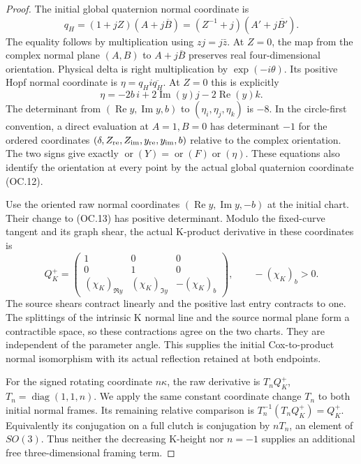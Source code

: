 \begin{proof}
The initial global quaternion normal coordinate is
\[
 q_H=(1+jZ)(A+j\overline B)
     =(Z^{-1}+j)(A'+j\overline {B'}).
 \tag{OC.12}
\]
The equality follows by multiplication using \(zj=j\bar z\).
At \(Z=0\), the map from the complex normal plane \((A,B)\) to
\(A+j\overline B\) preserves real four-dimensional orientation.
Physical delta is right multiplication by \(\exp(-i \theta)\). Its
positive Hopf normal coordinate is \(\eta=q_Hi\overline{q_H}\).
At \(Z=0\) this is explicitly
\[
 \eta=-2b\,i+2\operatorname{Im}(y)j-2\operatorname{Re}(y)k.
 \tag{OC.13}
\]
The determinant from \((\operatorname{Re} y,\operatorname{Im} y,b)\) to \((\eta_i,\eta_j,\eta_k)\) is \(-8\).
In the circle-first convention, a direct evaluation at \(A=1,B=0\)
has determinant \(-1\) for the ordered coordinates
\((\delta,Z_{\rm re},Z_{\rm im},y_{\rm re},y_{\rm im},b)\) relative to the complex orientation.
The two signs give exactly \(\operatorname{or}(Y)=\operatorname{or}(F)\operatorname{or}(\eta)\). These equations
also identify the orientation at every point by the actual global
quaternion coordinate (OC.12).

Use the oriented raw normal coordinates \((\operatorname{Re} y,\operatorname{Im} y,-b)\) at the
initial chart. Their change to (OC.13) has positive determinant.
Modulo the fixed-curve tangent and its graph shear, the actual
K-product derivative in these coordinates is
\[
 Q_K^+=\begin{pmatrix}
 1&0&0\\0&1&0\\
 (\chi_K)_{\Re y}&(\chi_K)_{\Im y}&-(\chi_K)_b
 \end{pmatrix},\qquad-(\chi_K)_b>0.
 \tag{OC.14}
\]
The source shears contract linearly and the positive last entry
contracts to one. The splittings of the intrinsic K normal line and
the source normal plane form a contractible space, so these
contractions agree on the two charts. They are independent of the
parameter angle. This supplies the initial Cox-to-product normal
isomorphism with its actual reflection retained at both endpoints.

For the signed rotating coordinate \(n \kappa\), the raw derivative is
\(T_n Q_K^+\), \(T_n=\operatorname{diag}(1,1,n)\). We apply the same constant coordinate
change \(T_n\) to both initial normal frames. Its remaining relative
comparison is \(T_n^{-1}(T_n Q_K^+)=Q_K^+\). Equivalently its conjugation
on a full clutch is conjugation by \(n T_n\), an element of \(SO(3)\).
Thus neither the decreasing K-height nor \(n=-1\) supplies an additional
free three-dimensional framing term.


\end{proof}
